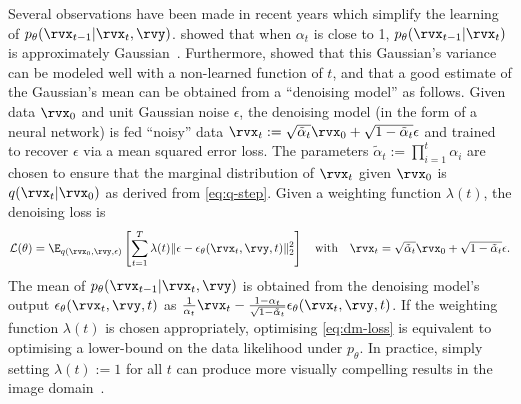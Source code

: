 Several observations have been made in recent years which simplify the learning of $p_\theta(\rvx_{t-1}|\rvx_t,\rvy)$. \citet{sohl2015deep} showed that when $\alpha_t$ is close to 1, $p_\theta(\rvx_{t-1}|\rvx_t)$ is approximately Gaussian~\cite{sohl2015deep}. Furthermore, \citet{ho2020denoising} showed that this Gaussian's variance can be modeled well with a non-learned function of $t$, and that a good estimate of the Gaussian's mean can be obtained from a ``denoising model'' as follows. Given data $\rvx_0$ and unit Gaussian noise $\epsilon$, the denoising model (in the form of a neural network) is fed ``noisy'' data $\rvx_t := \sqrt{\tilde{\alpha}_t} \rvx_0 + \sqrt{1 - \tilde{\alpha}_t} \epsilon$ and trained to recover $\epsilon$ via a mean squared error loss. The parameters $\tilde{\alpha}_t := \prod_{i=1}^t \alpha_i$ are chosen to ensure that the marginal distribution of $\rvx_t$ given $\rvx_0$ is $q(\rvx_t|\rvx_0)$ as derived from \cref{eq:q-step}. Given a weighting function $\lambda(t)$, the denoising loss is
\begin{equation} \label{eq:dm-loss}
    \mathcal{L}(\theta) = \E_{q(\rvx_0, \rvy, \epsilon)} \left[ \sum_{t=1}^T \lambda(t) \lVert \epsilon - \epsilon_\theta(\rvx_t, \rvy, t) \rVert_2^2 \right] \quad \text{with} \quad \rvx_t = \sqrt{\tilde{\alpha}_t} \rvx_0 + \sqrt{1 - \tilde{\alpha}_t} \epsilon.
\end{equation}
The mean of $p_\theta(\rvx_{t-1}|\rvx_t,\rvy)$ is obtained from the denoising model's output $\epsilon_\theta(\rvx_t, \rvy, t)$ as ${\frac{1}{\alpha_t}\rvx_t - \frac{1-\alpha_t}{\sqrt{1-\tilde{\alpha}_t}}\epsilon_\theta(\rvx_t, \rvy, t)}$.
If the weighting function $\lambda(t)$ is chosen appropriately, optimising \cref{eq:dm-loss} is equivalent to optimising a lower-bound on the data likelihood under $p_\theta$. In practice, simply setting $\lambda(t) := 1$ for all $t$ can produce more visually compelling results in the image domain~\citep{ho2020denoising}.



